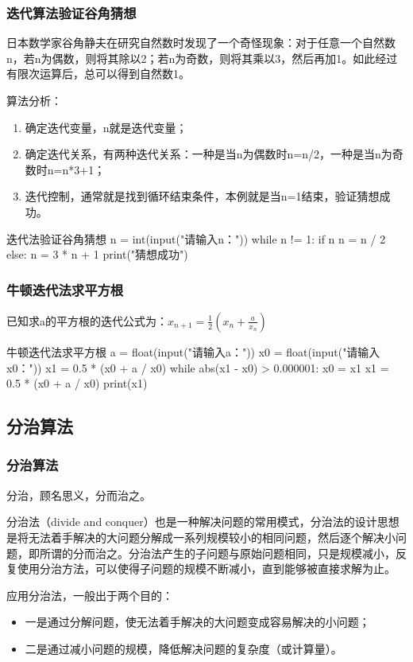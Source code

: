 \begin{frame}[fragile]
    \frametitle{迭代算法验证谷角猜想}
      日本数学家谷角静夫在研究自然数时发现了一个奇怪现象：对于任意一个自然数n，若n为偶数，则将其除以2；若n为奇数，则将其乘以3，然后再加1。如此经过有限次运算后，总可以得到自然数1。
      \bigskip

      \begin{minipage}{0.53\linewidth}
            算法分析：
            \begin{enumerate}
              \item 确定迭代变量，n就是迭代变量；
              \item 确定迭代关系，有两种迭代关系：一种是当n为偶数时n=n/2，一种是当n为奇数时n=n*3+1；
              \item 迭代控制，通常就是找到循环结束条件，本例就是当n=1结束，验证猜想成功。
            \end{enumerate}
        \end{minipage}\hfill
        \begin{minipage}{0.43\linewidth}

\begin{codeblock}{迭代法验证谷角猜想}
  n = int(input("请输入n："))
  while n != 1:
      if n %
          n = n / 2
      else:
          n = 3 * n + 1
  print("猜想成功")
\end{codeblock}
        \end{minipage}
\end{frame}

\begin{frame}[fragile]
    \frametitle{牛顿迭代法求平方根}
      已知求a的平方根的迭代公式为：$x_{n+1} = \frac{1}{2}(x_n + \frac{a}{x_n})$
      \bigskip
\begin{codeblock}{牛顿迭代法求平方根}
  a = float(input("请输入a："))
  x0 = float(input("请输入x0："))
  x1 = 0.5 * (x0 + a / x0)
  while abs(x1 - x0) > 0.000001:
      x0 = x1
      x1 = 0.5 * (x0 + a / x0)
  print(x1)
\end{codeblock}
\end{frame}

\subsection{分治算法}

\begin{frame}
    \frametitle{分治算法}
    分治，顾名思义，分而治之。
    
    分治法（divide and conquer）也是一种解决问题的常用模式，分治法的设计思想是将无法着手解决的大问题分解成一系列规模较小的相同问题，然后逐个解决小问题，即所谓的分而治之。分治法产生的子问题与原始问题相同，只是规模减小，反复使用分治方法，可以使得子问题的规模不断减小，直到能够被直接求解为止。
    \bigskip

    应用分治法，一般出于两个目的：
    \begin{itemize}
      \item 一是通过分解问题，使无法着手解决的大问题变成容易解决的小问题；
      \item 二是通过减小问题的规模，降低解决问题的复杂度（或计算量）。
    \end{itemize}
\end{frame}

